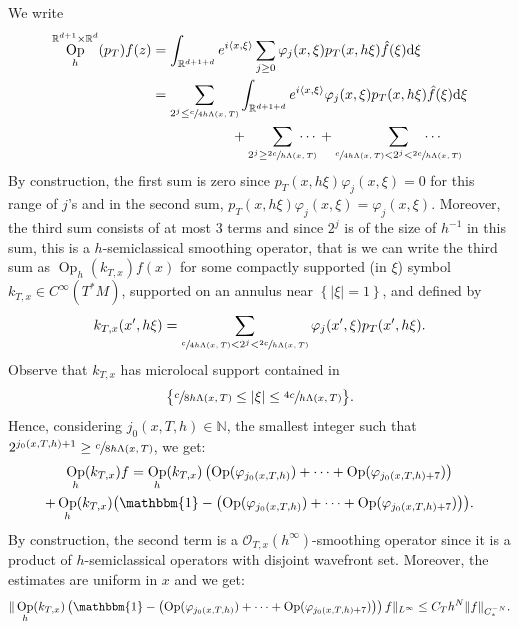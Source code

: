 \documentclass[JEP,XML,SOM,Unicode,NoFloatCountersInSection]{cedram}
\newcommand{\R}{\mathbb{R}}
\newcommand{\N}{\mathbb{N}}
\newcommand{\mc}{\mathcal}
\newcommand{\dd}{\mathrm{d}}
\DeclareMathOperator{\Op}{Op}
\theoremstyle{plain}
\theoremstyle{definition}
\begin{document}
We write
\begin{equation}
\label{equation:splitting}
\begin{split}
\Op^{\R^{d+1} \times \R^{d}}_h( p_T )f (z) & = \int_{\R^{d+1+d}} e^{i \langle x, \xi \rangle} \sum_{j \geq 0} \varphi_j(x,\xi) p_T(x,h\xi) \hat{f}(\xi) \dd \xi \\
& = \sum_{2^{j} \leq \sfrac{c}{4h\Lambda(x,T)}} \int_{\R^{d+1+d}} e^{i \langle x, \xi \rangle} \varphi_j(x,\xi) p_T(x,h\xi) \hat{f}(\xi) \dd \xi \\
& \hspace{2cm} + \sum_{2^{j} \geq \sfrac{2c}{h \Lambda(x,T)}}\hspace*{-.5cm}\cdots{} + \sum_{\sfrac{c}{4h \Lambda(x,T)} < 2^j < \sfrac{2c}{h\Lambda(x,T)}}\hspace*{-1cm} \cdots
\end{split}
\end{equation}
By construction, the first sum is zero since $p_T(x,h \xi) \varphi_j(x,\xi) = 0$ for this range of $j$'s and in the second sum, $p_T(x,h\xi) \varphi_j(x,\xi) = \varphi_j(x,\xi)$. Moreover, the third sum consists of at most $3$ terms and since $2^j$ is of the size of $h^{-1}$ in this sum, this is a $h$-semiclassical smoothing operator, that is we can write the third sum as $\Op_h(k_{T,x})f(x)$ for some compactly supported (in $\xi$) symbol $k_{T,x} \in C^\infty(T^*M)$, supported on an annulus near $\left\{|\xi|=1\right\}$, and defined by
\[
k_{T,x}(x',h\xi) = \sum_{\sfrac{c}{4h \Lambda(x,T)} < 2^j < \sfrac{2c}{h\Lambda(x,T)}} \varphi_j(x',\xi) p_T(x',h\xi).
\]
Observe that $k_{T,x}$ has microlocal support contained in
\[
\bigl\{ \sfrac{c}{8h\Lambda(x,T)} \leq |\xi| \leq \sfrac{4c}{h\Lambda(x,T)} \bigr\}.
\]
Hence, considering $j_0(x,T,h) \in \N$, the smallest integer such that $2^{j_0(x,T,h)+1} \geq \sfrac{c}{8h\Lambda(x,T)}$, we get:\vspace*{-5pt}
\begin{multline*}
\Op_h(k_{T,x})f = \Op_h(k_{T,x})\left( \Op(\varphi_{j_0(x,T,h)}) + \cdots + \Op(\varphi_{j_0(x,T,h)+7}) \right) \\
+ \Op_h(k_{T,x})\bigl( \mathbbm{1} - \left(\Op(\varphi_{j_0(x,T,h)}) + \cdots + \Op(\varphi_{j_0(x,T,h)+7}) \right) \bigr).
\end{multline*}
By construction, the second term is a $\mc{O}_{T,x}(h^\infty)$-smoothing operator since it is a product of $h$-semiclassical operators with disjoint wavefront set. Moreover, the estimates are uniform in $x$ and we get:
\[
\|\Op_h(k_{T,x})\left( \mathbbm{1} - \left(\Op(\varphi_{j_0(x,T,h)}) + \cdots + \Op(\varphi_{j_0(x,T,h)+7}) \right) \right)f\|_{L^\infty} \leq C_T h^N \|f\|_{C^{-N}_*}.
\]
\end{document}
